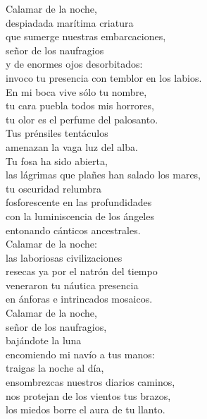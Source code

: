 

Calamar de la noche,\\
despiadada marítima criatura\\
que sumerge nuestras embarcaciones,\\
señor de los naufragios\\
y de enormes ojos desorbitados:\\
invoco tu presencia con temblor en los labios.\\
En mi boca vive sólo tu nombre,\\
tu cara puebla todos mis horrores,\\
tu olor es el perfume del palosanto.\\
Tus prénsiles tentáculos\\
amenazan la vaga luz del alba.\\
Tu fosa ha sido abierta,\\
las lágrimas que plañes han salado los mares,\\
tu oscuridad relumbra\\
fosforescente en las profundidades\\
con la luminiscencia de los ángeles\\
entonando cánticos ancestrales.\\
Calamar de la noche:\\
las laboriosas civilizaciones\\
resecas ya por el natrón del tiempo\\
veneraron tu náutica presencia\\
en ánforas e intrincados mosaicos.\\
Calamar de la noche,\\
señor de los naufragios,\\
bajándote la luna\\
encomiendo mi navío a tus manos:\\
traigas la noche al día,\\
ensombrezcas nuestros diarios caminos,\\
nos protejan de los vientos tus brazos,\\
los miedos borre el aura de tu llanto.\\

